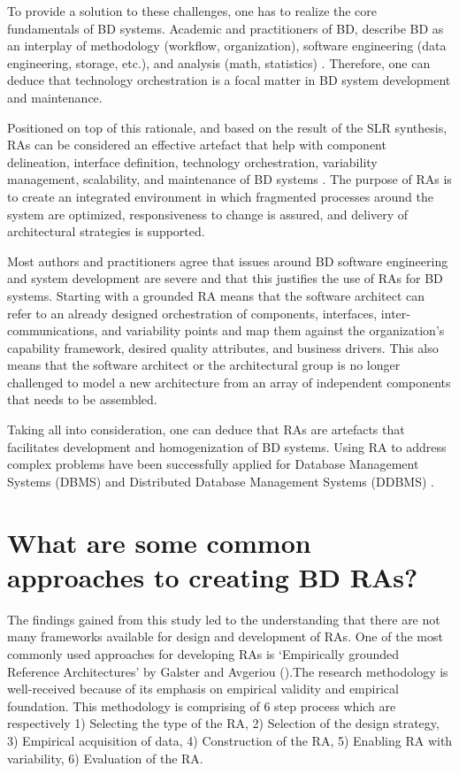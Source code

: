 \documentclass[review]{elsarticle}
\begin{document}
To provide a solution to these challenges, one has to realize the core fundamentals of BD systems. Academic and practitioners of BD, describe BD as an interplay of methodology (workflow, organization), software engineering (data engineering, storage, etc.), and analysis (math, statistics) \cite{akhtar2019big}\cite{AtaeiBigDataEnvirons}. Therefore, one can deduce that technology orchestration is a focal matter in BD system development and maintenance.

Positioned on top of this rationale, and based on the result of the SLR synthesis, RAs can be considered an effective artefact that help with component delineation, interface definition, technology orchestration, variability management, scalability, and maintenance of BD systems \cite{Chang}\cite{Nadal}. The purpose of RAs is to create an integrated environment in which fragmented processes around the system are optimized, responsiveness to change is assured, and delivery of architectural strategies is supported. 

Most authors and practitioners agree that issues around BD software engineering and system development are severe and that this justifies the use of RAs for BD systems. Starting with a grounded RA means that the software architect can refer to an already designed orchestration of components, interfaces, inter-communications, and variability points and map them against the organization’s capability framework, desired quality attributes, and business drivers. This also means that the software architect or the architectural group is no longer challenged to model a new architecture from an array of independent components that needs to be assembled.

Taking all into consideration, one can deduce that RAs are artefacts that facilitates development and homogenization of BD systems. Using RA to address complex problems have been successfully applied for Database Management Systems (DBMS) \cite{pineiro2019big} and Distributed Database Management Systems (DDBMS) \cite{rahimi2010distributed}.

\section{What are some common approaches to creating BD RAs?}

The findings gained from this study led to the understanding that there are not many frameworks available for design and development of RAs. One of the most commonly used approaches for developing RAs is ‘Empirically grounded Reference Architectures’ by Galster and Avgeriou (\cite{galster2011empirically}).The research methodology is well-received because of its emphasis on empirical validity and empirical foundation. This methodology is comprising of 6 step process which are respectively 1) Selecting the type of the RA, 2) Selection of the design strategy, 3) Empirical acquisition of data, 4) Construction of the RA, 5) Enabling RA with variability, 6) Evaluation of the RA.
\end{document}
